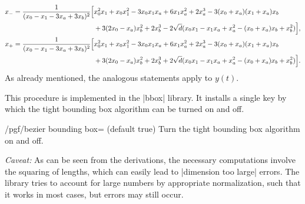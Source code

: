 \begin{subequations}
\begin{align}
    x_- &=
    \!\begin{aligned}[t]
        \frac{1}{(x_0 - x_1 - 3x_a + 3x_b)^2}
        \Bigl[
            & x_0^2x_1 + x_0x_1^2 - 3x_0x_1x_a + 6x_1x_a^2
              + 2x_a^3 - 3(x_0 + x_a)(x_1 + x_a)x_b \\
            & + 3(2x_0 - x_a)x_b^2 + 2x_b^3
              - 2\sqrt{d}(x_0x_1 - x_1x_a + x_a^2 - (x_0 + x_a)x_b + x_b^2)
        \Bigr],
    \end{aligned} \\
    x_+ &=
    \!\begin{aligned}[t]
        \frac{1}{(x_0 - x_1 - 3x_a + 3x_b)^2}
        \Bigl[
            & x_0^2x_1 + x_0x_1^2 - 3x_0x_1x_a + 6x_1x_a^2
              + 2x_a^3 - 3(x_0 + x_a)(x_1 + x_a)x_b \\
            & + 3(2x_0 - x_a)x_b^2 + 2x_b^3
              + 2\sqrt{d}(x_0x_1 - x_1x_a + x_a^2 - (x_0 + x_a)x_b + x_b^2)
        \Bigr].
    \end{aligned}
\end{align}
\end{subequations}
As already mentioned, the analogous
statements apply to $y(t)$.

This procedure is implemented in the |bbox| library.  It installs a single key
by which the tight bounding box algorithm can be turned on and off.

\begin{key}{/pgf/bezier bounding box= (default true)}
    Turn the tight bounding box algorithm on and off.

    \emph{Caveat:} As can be seen from the derivations, the necessary
    computations involve the squaring of lengths, which can easily lead to
    |dimension too large| errors.  The library tries to account for large
    numbers by appropriate normalization, such that it works in most cases, but
    errors may still occur.
\end{key}

\begin{codeexample}[]
\end{codeexample}


